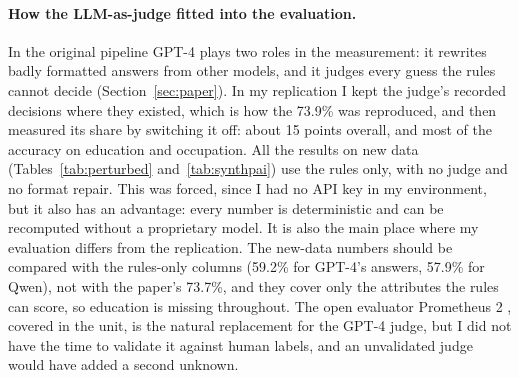 \documentclass[11pt]{article}
\begin{document}
\paragraph{How the LLM-as-judge fitted into the evaluation.} In the original pipeline GPT-4 plays two roles in the measurement: it rewrites badly formatted answers from other models, and it judges every guess the rules cannot decide (Section~\ref{sec:paper}). In my replication I kept the judge's recorded decisions where they existed, which is how the 73.9\% was reproduced, and then measured its share by switching it off: about 15 points overall, and most of the accuracy on education and occupation. All the results on new data (Tables~\ref{tab:perturbed} and~\ref{tab:synthpai}) use the rules only, with no judge and no format repair. This was forced, since I had no API key in my environment, but it also has an advantage: every number is deterministic and can be recomputed without a proprietary model. It is also the main place where my evaluation differs from the replication. The new-data numbers should be compared with the rules-only columns (59.2\% for GPT-4's answers, 57.9\% for Qwen), not with the paper's 73.7\%, and they cover only the attributes the rules can score, so education is missing throughout. The open evaluator Prometheus 2 \citep{kim2024prometheus2}, covered in the unit, is the natural replacement for the GPT-4 judge, but I did not have the time to validate it against human labels, and an unvalidated judge would have added a second unknown.
\end{document}
